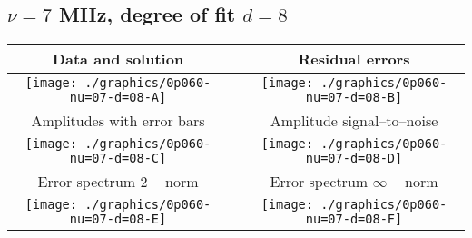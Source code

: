 

% 

\clearpage{}
\break{}

\subsection{$\nu = 7$ MHz, degree of fit $d = 8$}

\begin{table}[h]
    \begin{center}
        \begin{tabular}{ccc}
            Data and solution & \quad & Residual errors \\\hline
            \texttt{[image: ./graphics/0p060-nu=07-d=08-A]} &&
            \texttt{[image: ./graphics/0p060-nu=07-d=08-B]} \\[15pt]
            Amplitudes with error bars && Amplitude signal--to--noise \\\hline
            \texttt{[image: ./graphics/0p060-nu=07-d=08-C]} &&
            \texttt{[image: ./graphics/0p060-nu=07-d=08-D]} \\[15pt]
            Error spectrum $2-$norm && Error spectrum $\infty-$norm \\\hline
            \texttt{[image: ./graphics/0p060-nu=07-d=08-E]} &&
            \texttt{[image: ./graphics/0p060-nu=07-d=08-F]} \\[15pt]
        \end{tabular}
    \end{center}
\label{fig:elev=60, nu=7}
\end{table}



\endinput

